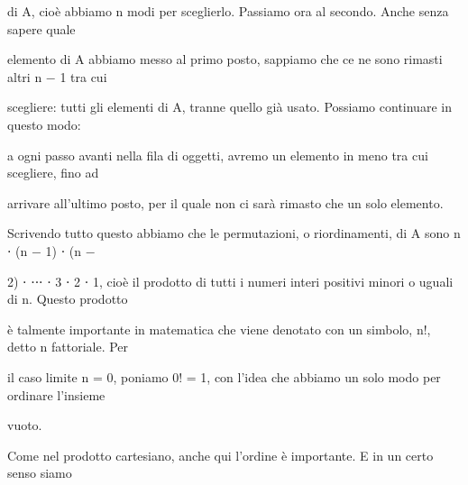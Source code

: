 \documentclass[a4paper,portrait,12pt]{article}
\begin{document}
\begin{flushleft}
di A, cio\`{e} abbiamo n modi per sceglierlo. Passiamo ora al secondo. Anche senza sapere quale
\end{flushleft}


\begin{flushleft}
elemento di A abbiamo messo al primo posto, sappiamo che ce ne sono rimasti altri n $-$ 1 tra cui
\end{flushleft}


\begin{flushleft}
scegliere: tutti gli elementi di A, tranne quello gi\`{a} usato. Possiamo continuare in questo modo:
\end{flushleft}


\begin{flushleft}
a ogni passo avanti nella fila di oggetti, avremo un elemento in meno tra cui scegliere, fino ad
\end{flushleft}


\begin{flushleft}
arrivare all'ultimo posto, per il quale non ci sar\`{a} rimasto che un solo elemento.
\end{flushleft}


\begin{flushleft}
Scrivendo tutto questo abbiamo che le permutazioni, o riordinamenti, di A sono n ⋅ (n $-$ 1) ⋅ (n $-$
\end{flushleft}


\begin{flushleft}
2) ⋅ ⋅⋅⋅ ⋅ 3 ⋅ 2 ⋅ 1, cio\`{e} il prodotto di tutti i numeri interi positivi minori o uguali di n. Questo prodotto
\end{flushleft}


\begin{flushleft}
\`{e} talmente importante in matematica che viene denotato con un simbolo, n!, detto n fattoriale. Per
\end{flushleft}


\begin{flushleft}
il caso limite n = 0, poniamo 0! = 1, con l'idea che abbiamo un solo modo per ordinare l'insieme
\end{flushleft}


\begin{flushleft}
vuoto.
\end{flushleft}


\begin{flushleft}
Come nel prodotto cartesiano, anche qui l'ordine \`{e} importante. E in un certo senso siamo
\end{flushleft}
\end{document}
